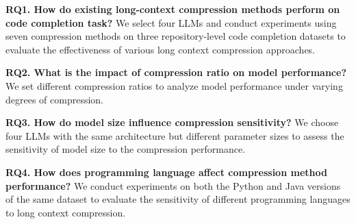 
%

\textbf{RQ1. How do existing long-context compression methods perform on code completion task?} We select four LLMs and conduct experiments using seven compression methods on three repository-level code completion datasets to evaluate the effectiveness of various long context compression approaches.

\textbf{RQ2. What is the impact of compression ratio on model performance?} We set different compression ratios to analyze model performance under varying degrees of compression.

\textbf{RQ3. How do model size influence compression sensitivity?} 
We choose four LLMs with the same architecture but different parameter sizes to assess the sensitivity of model size to the compression performance.

\textbf{RQ4. How does programming language affect compression method performance?} 
We conduct experiments on both the Python and Java versions of the same dataset to evaluate the sensitivity of different programming languages to long context compression.

